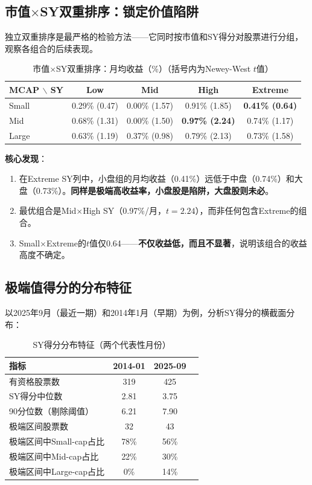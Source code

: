 \documentclass[10pt,a4paper]{ctexart}
\begin{document}
\subsection{市值$\times$SY双重排序：锁定价值陷阱}

独立双重排序是最严格的检验方法——它同时按市值和SY得分对股票进行分组，观察各组合的后续表现。

\begin{table}[htbp]
\centering
\caption{市值$\times$SY双重排序：月均收益（\%）（括号内为Newey-West $t$值）}
\begin{tabular}{lcccc}
\toprule
\textbf{MCAP $\backslash$ SY} & \textbf{Low} & \textbf{Mid} & \textbf{High} & \textbf{Extreme} \\
\midrule
Small & 0.29\% (0.47) & 0.00\% (1.57) & 0.91\% (1.85) & \textbf{0.41\% (0.64)} \\
Mid   & 0.68\% (1.31) & 0.00\% (1.50) & \textbf{0.97\% (2.24)} & 0.74\% (1.17) \\
Large & 0.63\% (1.19) & 0.37\% (0.98) & 0.79\% (2.13) & 0.73\% (1.58) \\
\bottomrule
\end{tabular}
\end{table}

\textbf{核心发现}：
\begin{enumerate}[label=(\arabic*)]
    \item 在Extreme SY列中，小盘组的月均收益（0.41\%）远低于中盘（0.74\%）和大盘（0.73\%）。\textbf{同样是极端高收益率，小盘股是陷阱，大盘股则未必}。
    \item 最优组合是Mid$\times$High SY（0.97\%/月，$t=2.24$），而非任何包含Extreme的组合。
    \item Small$\times$Extreme的$t$值仅0.64——\textbf{不仅收益低，而且不显著}，说明该组合的收益高度不确定。
\end{enumerate}

\subsection{极端值得分的分布特征}

以2025年9月（最近一期）和2014年1月（早期）为例，分析SY得分的横截面分布：

\begin{table}[htbp]
\centering
\caption{SY得分分布特征（两个代表性月份）}
\begin{tabular}{lccc}
\toprule
\textbf{指标} & \textbf{2014-01} & \textbf{2025-09} \\
\midrule
有资格股票数 & 319 & 425 \\
SY得分中位数 & 2.81 & 3.75 \\
90分位数（剔除阈值） & 6.21 & 7.90 \\
极端区间股票数 & 32 & 43 \\
极端区间中Small-cap占比 & 78\% & 56\% \\
极端区间中Mid-cap占比 & 22\% & 30\% \\
极端区间中Large-cap占比 & 0\% & 14\% \\
\bottomrule
\end{tabular}
\end{table}
\end{document}
